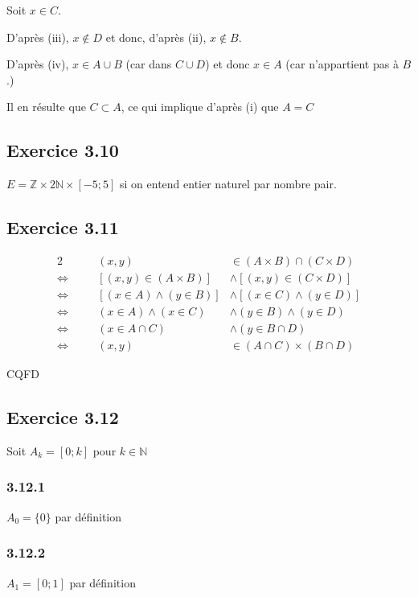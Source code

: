 \documentclass[a4paper,10pt]{report}
\begin{document}
Soit $x \in C$.

D'après (iii), $x \notin D$ et donc, d'après (ii), $x \notin B$.

D'après (iv), $x \in A \cup B$ (car dans $C \cup D$) et donc $x \in A$ (car n'appartient pas à $B$.)

Il en résulte que $C \subset A$, ce qui implique d'après (i) que $A = C$


\subsection*{Exercice 3.10}

$E = \mathbb{Z} \times 2\mathbb{N} \times [-5 ; 5]$ si on entend entier naturel par nombre pair.


\subsection*{Exercice 3.11}

\begin{alignat*}{2}
	                    &\quad &               (x,y) &\in (A \times B) \cap (C \times D)  \\
	\Longleftrightarrow &      &     [(x,y) \in (A \times B)] &\wedge [(x,y) \in (C \times D)]\\
	\Longleftrightarrow &      & [(x \in A) \wedge (y \in B)] &\wedge [(x \in C) \wedge (y \in D)]\\
	\Longleftrightarrow &      & (x \in A) \wedge (x \in C)   &\wedge (y \in B) \wedge (y \in D)\\
	\Longleftrightarrow &      &           (x \in A \cap C)   &\wedge (y \in B \cap D)\\
	\Longleftrightarrow &      &                        (x,y) &\in (A \cap C) \times (B \cap D)
\end{alignat*}

CQFD

\subsection*{Exercice 3.12}

Soit $A_k = [0;k]$ pour $k \in \mathbb{N}$

\subsubsection*{3.12.1}
$A_0 = \{0\}$ par définition

\subsubsection*{3.12.2}
$A_1 = [0 ; 1]$ par définition
\end{document}
